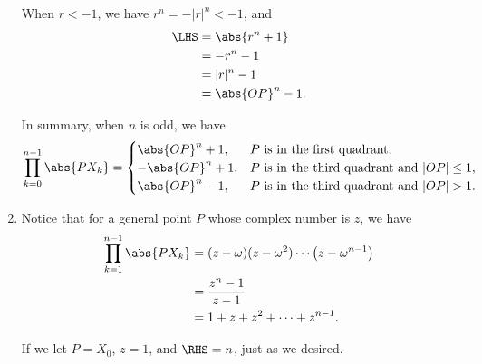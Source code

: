 \begin{enumerate}
          When \(r < -1\), we have \(r^n = -|r|^n < -1\), and
          \begin{align*}
              \LHS & = \abs{r^n + 1}   \\
                   & = -r^n - 1        \\
                   & = |r|^n - 1       \\
                   & = \abs{OP}^n - 1.
          \end{align*}

          In summary, when \(n\) is odd, we have
          \[
              \prod_{k = 0}^{n - 1} \abs{P X_k} =
              \begin{cases}
                  \abs{OP}^n + 1,  & P \text{ is in the first quadrant},                  \\
                  -\abs{OP}^n + 1, & P \text{ is in the third quadrant and } |OP| \leq 1, \\
                  \abs{OP}^n - 1,  & P \text{ is in the third quadrant and } |OP| > 1.
              \end{cases}
          \]

    \item Notice that for a general point \(P\) whose complex number is \(z\), we have
          \begin{align*}
              \prod_{k = 1}^{n - 1} \abs{P X_k} & = (z - \omega) (z - \omega^2) \cdots \left(z - \omega^{n - 1}\right) \\
                                                & = \frac{z^n - 1}{z - 1}                                              \\
                                                & = 1 + z + z^2 + \cdots + z^{n - 1}.
          \end{align*}

          If we let \(P = X_0\), \(z = 1\), and \(\RHS = n\), just as we desired.
\end{enumerate}